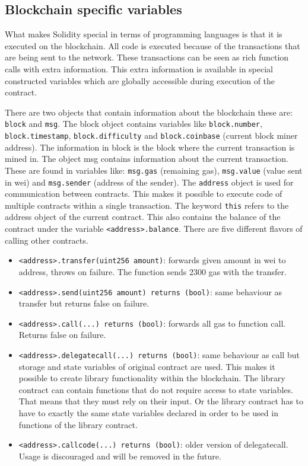 \documentclass[a4paper]{article}
\begin{document}
\subsection{Blockchain specific variables}
What makes Solidity special in terms of programming languages is that it is executed on the blockchain. All code is executed because of the transactions that are being sent to the network. These transactions can be seen as rich function calls with extra information. This extra information is available in special constructed variables which are globally accessible during execution of the contract.\par
There are two objects that contain information about the blockchain these are: \texttt{block} and \texttt{msg}. The block object contains variables like \texttt{block.number}, \texttt{block.timestamp}, \texttt{block.difficulty} and \texttt{block.coinbase} (current block miner address). The information in block is the block where the current transaction is mined in. The object msg contains information about the current transaction. These are found in variables like: \texttt{msg.gas} (remaining gas), \texttt{msg.value} (value sent in wei) and \texttt{msg.sender} (address of the sender).
The \texttt{address} object is used for communication between contracts. This makes it possible to execute code of multiple contracts within a single transaction. The keyword \texttt{this} refers to the address object of the current contract. This also contains the balance of the contract under the variable \texttt{<address>.balance}. There are five different flavors of calling other contracts.
\begin{itemize}
    \item \texttt{<address>.transfer(uint256 amount)}: forwards given amount in wei to address, throws on failure. The function sends 2300 gas with the transfer. 
    \item \texttt{<address>.send(uint256 amount) returns (bool)}: same behaviour as transfer but returns false on failure.
    \item \texttt{<address>.call(...) returns (bool)}: forwards all gas to function call. Returns false on failure.
    \item \texttt{<address>.delegatecall(...) returns (bool)}: same behaviour as call but storage and state variables of original contract are used. This makes it possible to create library functionality within the blockchain. The library contract can contain functions that do not require access to state variables. That means that they must rely on their input. Or the library contract has to have to exactly the same state variables declared in order to be used in functions of the library contract.
    \item \texttt{<address>.callcode(...) returns (bool)}: older version of delegatecall. Usage is discouraged and will be removed in the future.
\end{itemize}
\end{document}
